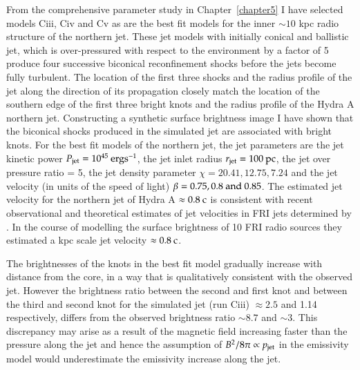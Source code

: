 From the comprehensive parameter study in Chapter~\ref{chapter5} I have selected models Ciii, Civ and Cv as are the best fit models for the inner $\sim 10$ kpc radio structure of the northern jet. These jet models with initially conical and ballistic jet, which is over-pressured with respect to the environment by a factor of 5 produce four successive biconical reconfinement shocks before the jets become fully turbulent. The location of the first three shocks and the radius profile of the jet along the direction of its propagation closely match the location of the southern edge of the first three bright knots and the radius profile of the Hydra A northern jet. Constructing a synthetic surface brightness image I have shown that the biconical shocks produced in the simulated jet are associated with bright knots. For the best fit models of the northern jet, the jet parameters are the jet kinetic power $P_{\rm jet}=10^{45} \> \rm erg \rm s^{-1}$,  the jet inlet radius $r_{\rm jet}=100 \rm \> pc$, the jet over pressure ratio  = 5,  the jet density parameter $\chi = 20.41, 12.75, 7.24$ and the jet velocity (in units of the speed of light) $\beta = 0.75, 0.8 \rm \ and \ 0.85$. The estimated jet velocity for the northern jet of Hydra A $\approx 0.8 \rm \> c$ is consistent with recent observational and theoretical estimates of jet velocities in FRI jets determined by \citet{laing14}. In the course of modelling the surface brightness of 10 FRI radio sources they estimated a kpc scale jet velocity $\approx 0.8 \rm \> c$.

The brightnesses of the knots in the best fit model gradually increase with distance from the core, in a way that is qualitatively consistent with the observed jet. However the brightness ratio between the second and first knot and between the third and second knot for the simulated jet (run Ciii) $\approx 2.5$ and 1.14 respectively, differs from the observed brightness ratio $\sim8.7$ and $\sim3$. This discrepancy may arise as a result of the magnetic field increasing faster than the pressure along the jet and hence the assumption of $B^2/8\pi \propto p_{\rm jet}$ in the emissivity model would underestimate the emissivity increase along the jet. 

